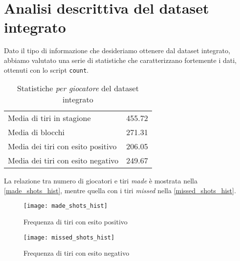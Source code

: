 \pagebreak
\section{Analisi descrittiva del dataset integrato}

Dato il tipo di informazione che desideriamo ottenere dal dataset integrato, abbiamo valutato una serie di statistiche che caratterizzano fortemente i dati, ottenuti con lo script \texttt{count}.

\begin{table}[h!]
\centering
	\begin{tabular}{l l} 
	 
		Media di tiri in stagione& 455.72 \\
		Media di blocchi& 271.31 \\
		Media dei tiri con esito positivo& 206.05\\
		Media dei tiri con esito negativo& 249.67\\
		\end{tabular}
		\caption{Statistiche \textit{per giocatore} del dataset integrato}
\end{table}

La relazione tra numero di giocatori e tiri \textit{made} è mostrata nella \autoref{made_shots_hist}, mentre quella con i tiri \textit{missed} nella \autoref{missed_shots_hist}.

\begin{figure}
\caption{Frequenza di tiri con esito positivo}
\label{made_shots_hist}
\texttt{[image: made\_shots\_hist]}
\end{figure}

\begin{figure}
\caption{Frequenza di tiri con esito negativo}
\label{missed_shots_hist}
\texttt{[image: missed\_shots\_hist]}
\end{figure}
